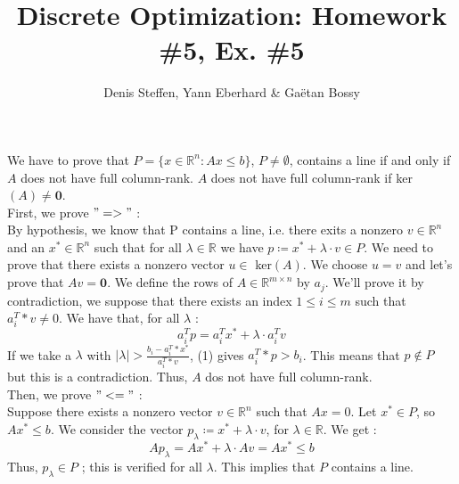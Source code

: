 \documentclass[a4paper,11pt,french]{article}
\title{Discrete Optimization: Homework \#5, Ex. \#5}
\author{Denis Steffen, Yann Eberhard \& Gaëtan Bossy}
\begin{document}
    
    \maketitle
    
    We have to prove that $P = \{ x \in \mathbb{R}^n : Ax \leq b\}$, $P \not = \emptyset $, contains a line if and only if $A$ does not have full column-rank.
    $A$ does not have full column-rank if ker$(A) \not = \mathbf 0$. 
\\

    First, we prove  $"=>"$ : \\
    By hypothesis, we know that P contains a line, i.e. there exits a nonzero $v \in \mathbb{R}^n$ and an $x^* \in \mathbb{R}^n$ such that for all $\lambda \in \mathbb{R}$ we have $ p \coloneqq x^* + \lambda \cdot v \in P$. 
    We need to prove that there exists a nonzero vector $u \in$ ker$(A)$. 
    We choose $u = v$ and let's prove that $Av = \mathbf 0$. We define the rows of $A \in \mathbb{R}^{m \times n}$ by $a_j$. We'll prove it by contradiction, we suppose that there exists an index $1 \leq i \leq m$ such that $a_i^T*v \not = 0$. We have that, for all $\lambda$ : 
    \begin{equation}
        a_i^Tp = a_i^Tx^* + \lambda \cdot a_i^Tv
    \end{equation}
    If we take a $\lambda$ with $\left| \lambda \right| > \frac{ b_i - a_i^T*x^*}{a_i^T*v}$, (1) gives $a_i^T*p > b_i$. 
    This means that $p \not \in P$ but this is a contradiction. Thus, $A$ dos not have full column-rank.
    \\

    Then, we prove $"<="$ : 
    \\ Suppose there exists a nonzero vector $v \in \mathbb{R}^n$ such that $Ax = 0$. 
    Let $x^* \in P$, so $Ax^* \leq b$. We consider the vector $p_\lambda \coloneqq x^* + \lambda \cdot v$, for $\lambda \in \mathbb{R}$. 
    We get : 
    \begin{equation*}
        Ap_\lambda = Ax^* + \lambda \cdot Av = Ax^* \leq b
    \end{equation*}
    Thus, $p_\lambda \in P$ ; this is verified for all $\lambda$. This implies that $P$ contains a line.

    
    
\end{document}
